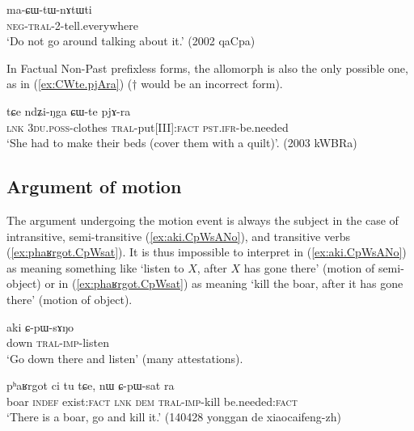 \begin{exe}
\ex  \label{ex:maCWtWnAtWi}
 \gll ma-ɕɯ-tɯ-nɤtɯti \\
 \textsc{neg}-\textsc{tral}-2-tell.everywhere \\
 \glt `Do not go around talking about it.' (2002 qaCpa)
\end{exe}

In Factual Non-Past prefixless forms, the allomorph  is also the only possible one, as in (\ref{ex:CWte.pjAra}) ($\dagger$ would be an incorrect form).

\begin{exe}
\ex  \label{ex:CWte.pjAra}
 \gll  tɕe ndʑi-ŋga ɕɯ-te pjɤ-ra \\
 \textsc{lnk} \textsc{3du}.\textsc{poss}-clothes \textsc{tral}-put[III]:\textsc{fact} \textsc{pst}.\textsc{ifr}-be.needed \\
 \glt `She had to make their beds (cover them with a quilt)'. (2003 kWBRa)
\end{exe}

\subsection{Argument of motion} \label{sec:AM.argument.motion}

The argument undergoing the motion event is always the subject in the case of intransitive, semi-transitive (\ref{ex:aki.CpWsANo}), and transitive verbs (\ref{ex:phaʁrgot.CpWsat}). It is thus impossible to interpret  in (\ref{ex:aki.CpWsANo}) as meaning something like `listen to $X$, after $X$ has gone there' (motion of semi-object) or  in (\ref{ex:phaʁrgot.CpWsat}) as meaning `kill the boar, after it has gone there' (motion of object).
 
\begin{exe}
\ex  \label{ex:aki.CpWsANo}
 \gll aki ɕ-pɯ-sɤŋo \\
 down \textsc{tral}-\textsc{imp}-listen \\
\glt `Go down there and listen' (many attestations).
\end{exe}

\begin{exe}
\ex  \label{ex:phaʁrgot.CpWsat}
 \gll pʰaʁrgot ci tu tɕe, nɯ ɕ-pɯ-sat ra \\
boar \textsc{indef} exist:\textsc{fact} \textsc{lnk} \textsc{dem} \textsc{tral}-\textsc{imp}-kill be.needed:\textsc{fact} \\
\glt `There is a boar, go and kill it.' (140428 yonggan de xiaocaifeng-zh) 
\end{exe}

